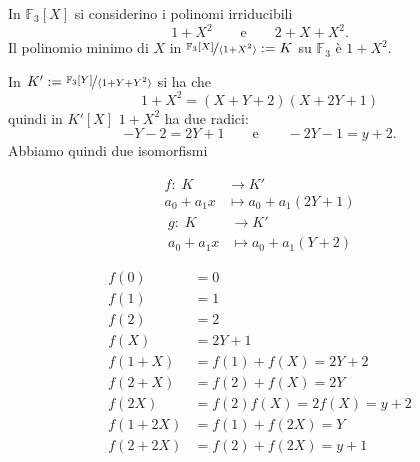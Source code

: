 \documentclass[../main.tex]{subfiles}
\begin{document}
\begin{example}
    In $\mathbb{F}_3[X]$ si considerino i polinomi irriducibili
    \begin{equation*}
        1 + X^2 \qquad \text{e} \qquad 2 + X + X^2.
    \end{equation*}
    Il polinomio minimo di $X$ in $\nicefrac{\mathbb{F}_3[X]}{\langle 1 + X^2 \rangle} := K$ su $\mathbb{F}_3$ è $1 + X^2$.

    In $K' := \nicefrac{\mathbb{F}_3[Y]}{\langle 1 + Y + Y^2\rangle}$ si ha che
    \begin{equation*}
        1 + X^2 = (X + Y + 2)(X + 2Y + 1)
    \end{equation*}
    quindi in $K'[X]$ $1 + X^2$ ha due radici:
    \begin{equation*}
        -Y-2 = 2Y+1 \qquad \text{e} \qquad -2Y - 1 = y + 2.
    \end{equation*}
    Abbiamo quindi due isomorfismi
    \begin{multicols}{2}
        \begin{align*}
            f: \; K    & \rightarrow K'            \\
            a_0 + a_1x & \mapsto a_0 + a_1(2Y + 1)
        \end{align*}
        \columnbreak
        \begin{align*}
            g: \; K    & \rightarrow K'           \\
            a_0 + a_1x & \mapsto a_0 + a_1(Y + 2)
        \end{align*}
    \end{multicols}
    \begin{multicols}{2}
        \begin{align*}
            f(0)      & = 0                        \\
            f(1)      & = 1                        \\
            f(2)      & = 2                        \\
            f(X)      & = 2Y + 1                   \\
            f(1 + X)  & = f(1) + f(X) = 2Y + 2     \\
            f(2 + X)  & = f(2) + f(X) = 2Y         \\
            f(2X)     & = f(2)f(X) = 2f(X) = y + 2 \\
            f(1 + 2X) & = f(1) + f(2X) = Y         \\
            f(2 + 2X) & = f(2) + f(2X) = y + 1
        \end{align*}


\end{multicols}
\end{example}
\end{document}
